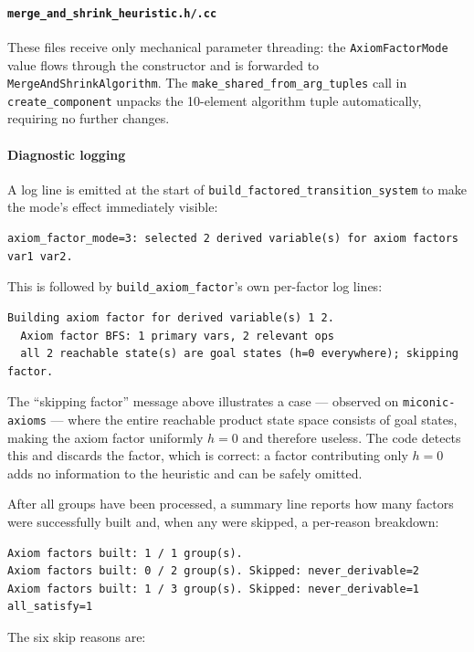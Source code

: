 \documentclass[11pt,a4paper]{article}
\begin{document}
\paragraph{\texttt{merge\_and\_shrink\_heuristic.h/.cc}}

These files receive only mechanical parameter threading: the
\texttt{AxiomFactorMode} value flows through the constructor and is forwarded
to \texttt{MergeAndShrinkAlgorithm}.  The \texttt{make\_shared\_from\_arg\_tuples}
call in \texttt{create\_component} unpacks the 10-element algorithm tuple
automatically, requiring no further changes.

\paragraph{Diagnostic logging}

A log line is emitted at the start of \texttt{build\_factored\_transition\_system}
to make the mode's effect immediately visible:
\begin{lstlisting}
axiom_factor_mode=3: selected 2 derived variable(s) for axiom factors var1 var2.
\end{lstlisting}
This is followed by \texttt{build\_axiom\_factor}'s own per-factor log lines:
\begin{lstlisting}
Building axiom factor for derived variable(s) 1 2.
  Axiom factor BFS: 1 primary vars, 2 relevant ops
  all 2 reachable state(s) are goal states (h=0 everywhere); skipping factor.
\end{lstlisting}
The ``skipping factor'' message above illustrates a case --- observed on
\texttt{miconic-axioms} --- where the entire reachable product state space
consists of goal states, making the axiom factor uniformly $h = 0$ and
therefore useless.  The code detects this and discards the factor, which is
correct: a factor contributing only $h = 0$ adds no information to the
heuristic and can be safely omitted.

After all groups have been processed, a summary line reports how many
factors were successfully built and, when any were skipped, a per-reason
breakdown:
\begin{lstlisting}
Axiom factors built: 1 / 1 group(s).
Axiom factors built: 0 / 2 group(s). Skipped: never_derivable=2
Axiom factors built: 1 / 3 group(s). Skipped: never_derivable=1 all_satisfy=1
\end{lstlisting}
The six skip reasons are:
\end{document}
